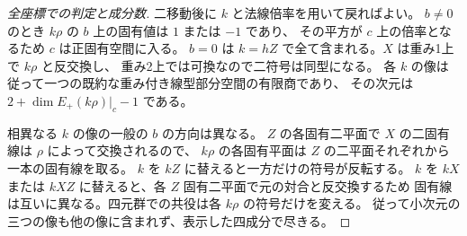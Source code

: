 \begin{proof}[全座標での判定と成分数]
二移動後に $k$ と法線倍率を用いて戻ればよい。
$b\ne0$ のとき $k\rho$ の $b$ 上の固有値は $1$ または $-1$ であり、
その平方が $c$ 上の倍率となるため $c$ は正固有空間に入る。
$b=0$ は $k=hZ$ で全て含まれる。$X$ は重み1上で $k\rho$ と反交換し、
重み2上では可換なので二符号は同型になる。
各 $k$ の像は従って一つの既約な重み付き線型部分空間の有限商であり、
その次元は $2+\dim E_+(k\rho)|_c-1$ である。

相異なる $k$ の像の一般の $b$ の方向は異なる。
$Z$ の各固有二平面で $X$ の二固有線は $\rho$ によって交換されるので、
$k\rho$ の各固有平面は $Z$ の二平面それぞれから一本の固有線を取る。
$k$ を $kZ$ に替えると一方だけの符号が反転する。
$k$ を $kX$ または $kXZ$ に替えると、各 $Z$ 固有二平面で元の対合と反交換するため
固有線は互いに異なる。四元群での共役は各 $k\rho$ の符号だけを変える。
従って小次元の三つの像も他の像に含まれず、表示した四成分で尽きる。
\end{proof}
